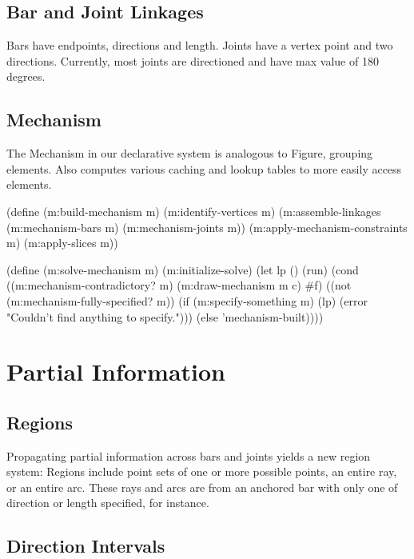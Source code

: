 \subsection{Bar and Joint Linkages}

Bars have endpoints, directions and length. Joints have a vertex point
and two directions. Currently, most joints are directioned and have
max value of 180 degrees.

\subsection{Mechanism}

The Mechanism in our declarative system is analogous to Figure,
grouping elements. Also computes various caching and lookup tables to
more easily access elements.

\begin{code-listing}
(define (m:build-mechanism m)
  (m:identify-vertices m)
  (m:assemble-linkages (m:mechanism-bars m)
                       (m:mechanism-joints m))
  (m:apply-mechanism-constraints m)
  (m:apply-slices m))

(define (m:solve-mechanism m)
  (m:initialize-solve)
  (let lp ()
    (run)
    (cond ((m:mechanism-contradictory? m)
           (m:draw-mechanism m c)
           #f)
          ((not (m:mechanism-fully-specified? m))
           (if (m:specify-something m)
               (lp)
               (error "Couldn't find anything to specify.")))
          (else 'mechanism-built))))
\end{code-listing}

\section{Partial Information}

\subsection{Regions}

Propagating partial information across bars and joints yields a new
region system: Regions include point sets of one or more possible
points, an entire ray, or an entire arc. These rays and arcs are
from an anchored bar with only one of direction or length specified,
for instance.

\subsection{Direction Intervals}

